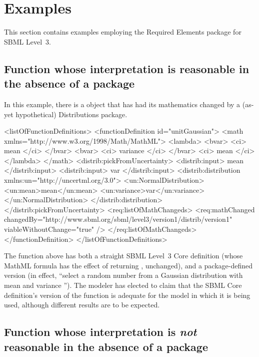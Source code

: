 
\section{Examples}
\label{examples}

This section contains examples employing the Required Elements package for SBML Level~3.

\subsection{Function whose interpretation is reasonable in the absence of a package}

In this example, there is a \FunctionDefinition object that has had its mathematics changed by a (as-yet hypothetical) Distributions package.

\begin{example}
<listOfFunctionDefinitions> 
  <functionDefinition id="unitGaussian"> 
    <math xmlns="http://www.w3.org/1998/Math/MathML"> 
      <lambda>
        <bvar>
          <ci> mean </ci>
        </bvar>
        <bvar>
          <ci> variance </ci>
        </bvar>
        <ci> mean </ci>
      </lambda>
    </math> 
    <distrib:pickFromUncertainty>
      <distrib:input> mean </distrib:input>
      <distrib:input> var </distrib:input>
      <distrib:distribution xmlns:un="http://uncertml.org/3.0">
        <un:NormalDistribution>
           <un:mean>mean</un:mean>
           <un:variance>var</un:variance>
         </un:NormalDistribution>
      </distrib:distribution>
    </distrib:pickFromUncertainty>
    <req:listOfMathChangeds>
      <req:mathChanged changedBy="http://www.sbml.org/sbml/level3/version1/distrib/version1"
                       viableWithoutChange="true" />
    </req:listOfMathChangeds>
  </functionDefinition> 
</listOfFunctionDefinitions> 
\end{example}

The function  above has both a straight SBML Level~3 Core definition (whose MathML formula has the effect of returning , unchanged), and a package-defined version (in effect, ``select a random number from a Gaussian distribution with mean  and variance ''). The modeler has elected to claim that the SBML Core definition's version of the function is adequate for the model in which it is being used, although different results are to be expected.


\subsection{Function whose interpretation is \emph{not} reasonable in the absence of a package}

